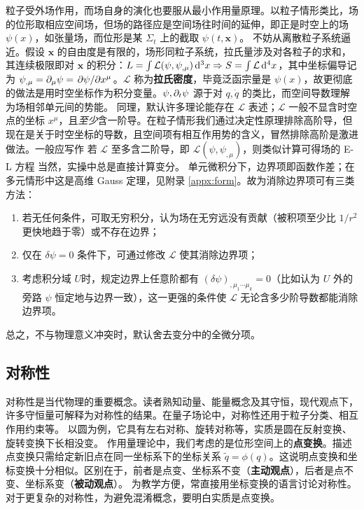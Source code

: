 粒子受外场作用，而场自身的演化也要服从最小作用量原理。以粒子情形类比，场的位形取相应空间场，但场的路径应是空间场往时间的延伸，即正是时空上的场 $\psi(x)$，如张量场，而位形是某 $\Sigma_t$ 上的截取 $\psi(t,\bm x)$。
不妨从离散粒子系统逼近。假设 $\bm x$ 的自由度是有限的，场形同粒子系统，拉氏量涉及对各粒子的求和，其连续极限即对 $\bm x$ 的积分：$L=\int\mathcal L(\psi,\psi_{,\mu})\dd[3]{x}\Rightarrow S=\int \mathcal L \dd[4]{x}$，其中坐标偏导记为 $\psi_{,\mu}=\partial_\mu\psi=\pdv*{\psi}{x^\mu}$。$\mathcal L$ 称为\textbf{拉氏密度}，毕竟泛函宗量是 $\psi(x)$，故更彻底的做法是用时空坐标作为积分变量。$\psi,\partial_t\psi$ 源于对 $q,\dot q$ 的类比，而空间导数理解为场相邻单元间的势能。
同理，默认许多理论能存在 $\mathcal L$ 表述；$\mathcal L$ 一般不显含时空点的坐标 $x^\mu$，且\textit{至少}含一阶导。在粒子情形我们通过决定性原理排除高阶导，但现在是关于时空坐标的导数，且空间项有相互作用势的含义，冒然排除高阶是激进做法。一般应写作
若 $\mathcal L$ 至多含二阶导，即 $\mathcal L(\psi,\psi_{,\mu})$，则类似计算可得场的 E-L 方程
当然，实操中总是直接计算变分。
单元微积分下，边界项即函数作差；在多元情形中这是高维 Gauss 定理，见附录 \ref{appx:form}。故为消除边界项可有三类方法：
\begin{enumerate}
    \item 若无任何条件，可取无穷积分，认为场在无穷远没有贡献（被积项至少比 $1/r^2$ 更快地趋于零）或不存在边界；
    \item 仅在 $\delta \psi=0$ 条件下，可通过修改 $\mathcal L$ 使其消除边界项；
    \item 考虑积分域 $U$时，规定边界上任意阶都有 $(\delta \psi)_{,\mu_1\cdots\mu_k}=0$（比如认为 $U$ 外的旁路 $\psi$ 恒定地与边界一致），这一更强的条件使 $\mathcal L$ 无论含多少阶导数都能消除边界项。
\end{enumerate}
总之，不与物理意义冲突时，默认舍去变分中的全微分项。

\subsection{对称性}

对称性是当代物理的重要概念。读者熟知动量、能量概念及其守恒，现代观点下，许多守恒量可解释为对称性的结果。在量子场论中，对称性还用于粒子分类、相互作用约束等。
以圆为例，它具有左右对称、旋转对称等，实质是圆在反射变换、旋转变换下长相没变。
作用量理论中，我们考虑的是位形空间上的\textbf{点变换}。描述点变换只需给定新旧点在同一坐标系下的坐标关系 $\tilde{q}=\phi(q)$。这说明点变换和坐标变换十分相似。区别在于，前者是点变、坐标系不变（\textbf{主动观点}），后者是点不变、坐标系变（\textbf{被动观点}）。
为教学方便，常直接用坐标变换的语言讨论对称性。对于更复杂的对称性，为避免混淆概念，要明白实质是点变换。

